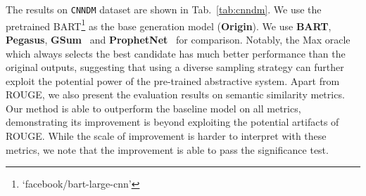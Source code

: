 \documentclass[11pt,a4paper]{article}
\begin{document}
The results on \texttt{CNNDM} dataset are shown in Tab.~\ref{tab:cnndm}.
We use the pretrained BART\footnote{`facebook/bart-large-cnn'} as the base generation model (\textbf{Origin}). We use \textbf{BART}, \textbf{Pegasus}, \textbf{GSum}~\citep{dou-etal-2021-gsum} and \textbf{ProphetNet}~\citep{qi-etal-2020-prophetnet} for comparison.
Notably, the Max oracle which always selects the best candidate has much better performance than the original outputs, suggesting that using a diverse sampling strategy can further exploit the potential power of the pre-trained abstractive system. 
Apart from ROUGE, we also present the evaluation results on semantic similarity metrics.
Our method is able to outperform the baseline model on all metrics, demonstrating its improvement is beyond exploiting the potential artifacts of ROUGE.
While the scale of improvement is harder to interpret with these metrics, we note that the improvement is able to pass the significance test. 
\end{document}
